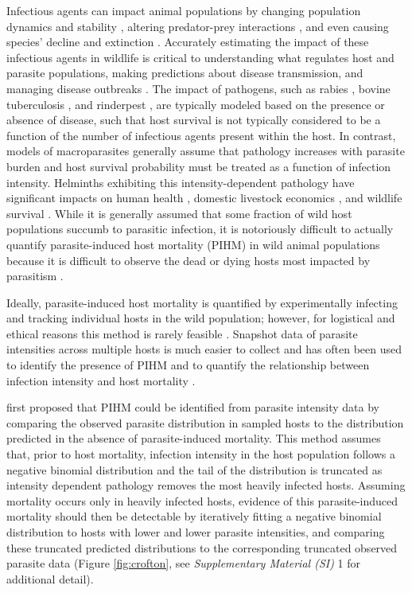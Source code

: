 \documentclass[12pt, a4paper]{article}
\begin{document}
Infectious agents can impact animal populations by changing
population dynamics and stability \citep{Dobson1992,Tompkins2002}, altering predator-prey interactions \citep{Joly2004}, and
even causing species' decline and extinction \citep{DeCastro2005a,McCallum2012b}. Accurately estimating the impact
of these infectious agents in wildlife is critical to understanding what
regulates host and parasite populations, making predictions about disease
transmission, and managing disease outbreaks \citep{Langwig2015}. The impact of pathogens, such as rabies \citep{Coyne1989}, bovine tuberculosis \citep{Cox2005}, and
rinderpest \citep{Tille1991}, are typically modeled based on the presence or absence of disease, such that host survival is not typically considered to be a function of the number of infectious agents present within the host.  In contrast, models of macroparasites generally assume that pathology increases with parasite burden and host survival probability must be treated as a function of infection intensity. Helminths exhibiting this intensity-dependent pathology have significant impacts on human health \citep{Brooker2004}, domestic livestock economics \citep{Roeber2013}, and wildlife survival \citep{Kirk2003,Logiudice2003}. While it is generally assumed that some fraction of wild host populations succumb to parasitic infection, it is notoriously difficult to actually quantify parasite-induced host mortality (PIHM) in wild animal populations because it is difficult to observe the dead or dying hosts most impacted by parasitism \citep{McCallum2000a}.

Ideally, parasite-induced host mortality is
quantified by experimentally infecting and tracking individual hosts in the
wild population; however, for logistical and ethical reasons this method is
rarely feasible \citep{McCallum2000a}. Snapshot data of parasite intensities across multiple hosts is much easier to collect and has
often been used to identify the presence of PIHM \citep{Crofton1971a,Lester1977,Lester1984,Lanciani1989,Royce1990,Ferguson2011} and to quantify the
relationship between infection intensity and host mortality \citep{Adjei1986}.

\cite{Crofton1971a} first proposed that PIHM could be identified from parasite intensity data by comparing the
observed parasite distribution in sampled hosts to the distribution
predicted in the absence of parasite-induced mortality. This method
assumes that, prior to host mortality, infection intensity in the host population follows a negative binomial distribution and the tail of the distribution is truncated as intensity dependent pathology removes the most heavily infected hosts. Assuming mortality occurs only in heavily infected hosts, evidence of this parasite-induced mortality should then be detectable by iteratively
fitting a negative binomial distribution to hosts with lower and lower parasite intensities, and comparing these truncated predicted distributions to the corresponding truncated observed parasite data (Figure \ref{fig:crofton}, see \emph{Supplementary Material (SI)} 1 for additional detail).
\end{document}
